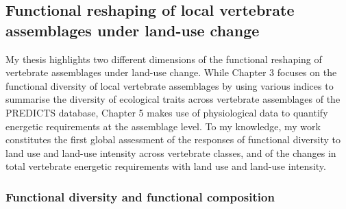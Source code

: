 


\subsection{Functional reshaping of local vertebrate assemblages under land-use change}

My thesis highlights two different dimensions of the functional reshaping of vertebrate assemblages under land-use change. While Chapter 3 focuses on the functional diversity of local vertebrate assemblages by using various indices to summarise the diversity of ecological traits across vertebrate assemblages of the PREDICTS database, Chapter 5 makes use of physiological data to quantify energetic requirements at the assemblage level. To my knowledge, my work constitutes the first global assessment of the responses of functional diversity to land use and land-use intensity across vertebrate classes, and of the changes in total vertebrate energetic requirements with land use and land-use intensity.

\subsubsection{Functional diversity and functional composition }


